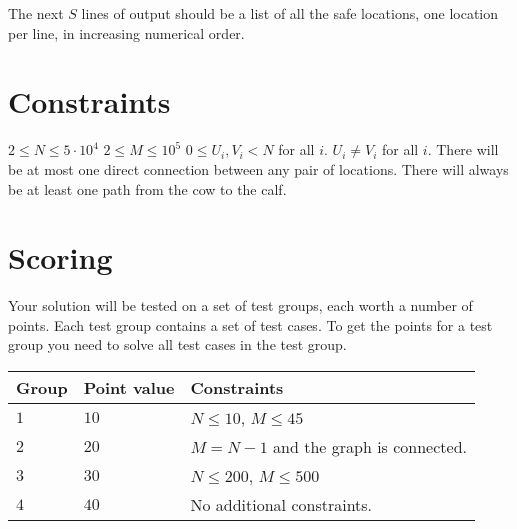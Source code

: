 The next $S$ lines of output should be a list of all the safe locations, 
one location per line, in increasing numerical order.

\section*{Constraints}
$2 \le N \le 5 \cdot 10^4$
\newline
$2 \le M \le 10^5$
\newline
$0 \le U_i, V_i < N$ for all $i$.
\newline
$U_i \neq V_i$ for all $i$.
\newline
There will be at most one direct connection between any pair of locations.
\newline
There will always be at least one path from the cow to the calf.

\section*{Scoring}
Your solution will be tested on a set of test groups, each worth a number of points. 
Each test group contains a set of test cases. 
To get the points for a test group you need to solve all test cases in the test group.

\noindent
\begin{tabular}{| l | l | p{12cm} |}
  \hline
  \textbf{Group} & \textbf{Point value} & \textbf{Constraints} \\ \hline
  $1$    & $10$       & $N \le 10$, $M \le 45$  \\ \hline
  $2$    & $20$       & $M = N-1$ and the graph is connected. \\ \hline
  $3$    & $30$       & $N \le 200$, $M \le 500$ \\ \hline
  $4$    & $40$       & No additional constraints. \\ \hline
\end{tabular}

